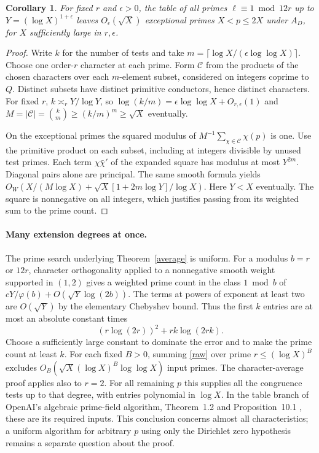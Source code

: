 \documentclass[11pt]{article}
\newtheorem{corollary}[theorem]{Corollary}
\begin{document}
\begin{corollary}\label{square}
For fixed $r$ and $\epsilon>0$, the table of all primes $\ell\equiv1\bmod 12r$
up to $Y=(\log X)^{1+\epsilon}$ leaves $O_{\epsilon}(\sqrt X)$ exceptional
primes $X<p\le2X$ under $A_D$, for $X$ sufficiently large in $r,\epsilon$.
\end{corollary}
\begin{proof}
Write $k$ for the number of tests and take
$m=\lceil\log X/(\epsilon\log\log X)\rceil$. Choose one order-$r$ character
at each prime. Form $\mathcal C$ from the products of the chosen characters
over each $m$-element subset, considered on integers coprime to $Q$.
Distinct subsets have distinct primitive conductors, hence distinct characters.
For fixed $r$, $k\asymp_r Y/\log Y$, so
$\log(k/m)=\epsilon\log\log X+O_{r,\epsilon}(1)$ and
$M=|\mathcal C|=\binom{k}{m}\ge(k/m)^m\ge\sqrt X$ eventually.

On the exceptional primes the squared modulus of
$M^{-1}\sum_{\chi\in\mathcal C}\chi(p)$ is one.
Use the primitive product on each subset, including at integers divisible by unused test primes.
Each term $\chi\bar\chi'$ of the expanded square has modulus at most $Y^{2m}$.
Diagonal pairs alone are principal. The same smooth formula yields
$O_W(X/(M\log X)+\sqrt X[1+2m\log Y]/\log X)$.
Here $Y<X$ eventually. The square is nonnegative on all integers, which justifies passing from its weighted sum to the prime count.
\end{proof}

\paragraph{Many extension degrees at once.}
The prime search underlying Theorem~\ref{average} is uniform.
For a modulus $b=r$ or $12r$, character orthogonality applied to a nonnegative smooth weight supported in $(1,2)$ gives a weighted prime count in the class $1\bmod b$ of
$cY/\varphi(b)+O(\sqrt Y\log(2b))$.
The terms at powers of exponent at least two are $O(\sqrt Y)$ by the elementary Chebyshev bound. Thus the first $k$ entries are at most an absolute constant times
\[
  (r\log(2r))^2+rk\log(2rk).
\]
Choose a sufficiently large constant to dominate the error and to make the prime count at least $k$. For each fixed $B>0$, summing \eqref{raw}
over prime $r\le(\log X)^B$ excludes $O_B(\sqrt X(\log X)^B\log\log X)$ input
primes. The character-average proof applies also to $r=2$.
For all remaining $p$ this supplies all the congruence tests up to
that degree, with entries polynomial in $\log X$.
In the table branch of OpenAI's algebraic prime-field algorithm, Theorem~1.2 and Proposition~10.1 \cite{PF}, these are its required inputs.
This conclusion concerns almost all characteristics; a uniform algorithm for
arbitrary $p$ using only the Dirichlet zero hypothesis remains a separate question about the proof.
\end{document}
